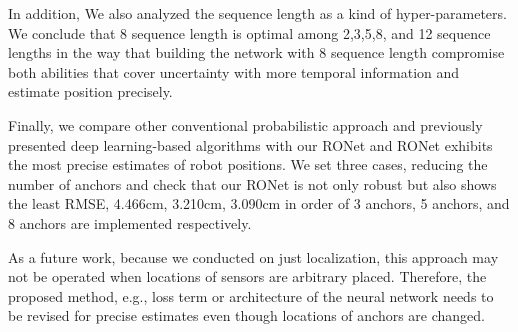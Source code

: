 \documentclass[letterpaper, 10 pt, conference]{ieeeconf}  %
\begin{document}
In addition, We also analyzed the sequence length as a kind of hyper-parameters. We conclude that 8 sequence length is optimal among 2,3,5,8, and 12 sequence lengths in the way that building the network with 8 sequence length compromise both abilities that cover uncertainty with more temporal information and estimate position precisely.

Finally, we compare other conventional probabilistic approach and previously presented deep learning-based algorithms with our RONet and RONet exhibits the most precise estimates of robot positions. We set three cases, reducing the number of anchors and check that our RONet is not only robust but also shows the least RMSE, 4.466cm, 3.210cm, 3.090cm in order of 3 anchors, 5 anchors, and 8 anchors are implemented respectively. 

As a future work, because we conducted on just localization, this approach may not be operated when locations of sensors are arbitrary placed. Therefore, the proposed method, e.g., loss term or architecture of the neural network needs to be revised for precise estimates even though locations of anchors are changed. 



\end{document}
